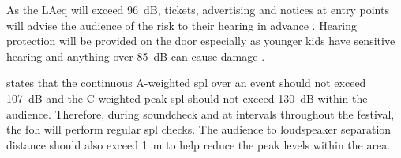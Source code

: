         As the LAeq will exceed \SI{96}{\dB}, tickets, advertising and notices at entry points will advise the audience of the risk to their hearing in advance \citep{hse-event-safety-noise}. Hearing protection will be provided on the door especially as younger kids have sensitive hearing and anything over \SI{85}{\dB} can cause damage \citep{rmbrecht2023}.

        \citet{hse-event-safety-noise} states that the continuous A-weighted \acrshort{spl} over an event should not exceed \SI{107}{\dB} and the C-weighted peak \acrshort{spl} should not exceed \SI{130}{\dB} within the audience. Therefore, during soundcheck and at intervals throughout the festival, the \acrshort{foh} will perform regular \acrshort{spl} checks. The audience to loudspeaker separation distance should also exceed \SI{1}{\metre} to help reduce the peak levels within the area.